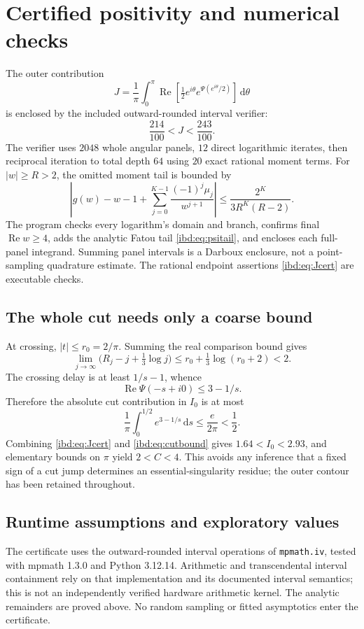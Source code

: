 \documentclass[11pt,letterpaper]{article}
\theoremstyle{remark}\newtheorem{remark}[theorem]{Remark}
\newcommand{\dd}{\,\mathrm d}
\DeclareMathOperator{\Rea}{Re}
\begin{document}
\section{Certified positivity and numerical checks}\label{ibd:sec:certificate}
The outer contribution
\[
 J=\frac1\pi\int_0^\pi
 \Rea\!\left[\tfrac12 e^{i\theta}e^{\Psi(e^{i\theta}/2)}\right]\dd\theta
\]
is enclosed by the included outward-rounded interval verifier:
\begin{equation}\label{ibd:eq:Jcert}
 \frac{214}{100}<J<\frac{243}{100}.
\end{equation}
The verifier uses $2048$ whole angular panels, $12$ direct logarithmic iterates, then reciprocal iteration to total depth $64$ using $20$ exact rational moment terms. For $|w|\geq R>2$, the omitted moment tail is bounded by
\begin{equation}\label{ibd:eq:momenttail}
 \left|g(w)-w-1+\sum_{j=0}^{K-1}\frac{(-1)^j\mu_j}{w^{j+1}}\right|
 \leq\frac{2^K}{3R^K(R-2)}.
\end{equation}
The program checks every logarithm's domain and branch, confirms final $\Rea w\geq4$, adds the analytic Fatou tail \eqref{ibd:eq:psitail}, and encloses each full-panel integrand. Summing panel intervals is a Darboux enclosure, not a point-sampling quadrature estimate. The rational endpoint assertions \eqref{ibd:eq:Jcert} are executable checks.

\subsection{The whole cut needs only a coarse bound}
At crossing, $|t|\leq r_0=2/\pi$. Summing the real comparison bound gives
\[
 \lim_{j\to\infty}\bigl(R_j-j+\tfrac13\log j\bigr)
 \leq r_0+\tfrac13\log(r_0+2)<2.
\]
The crossing delay is at least $1/s-1$, whence
\[
 \Rea\Psi(-s+i0)\leq3-1/s.
\]
Therefore the absolute cut contribution in $I_0$ is at most
\begin{equation}\label{ibd:eq:cutbound}
 \frac1\pi\int_0^{1/2}e^{3-1/s}\dd s
 \leq\frac e{2\pi}<\frac12.
\end{equation}
Combining \eqref{ibd:eq:Jcert} and \eqref{ibd:eq:cutbound} gives
$1.64<I_0<2.93$, and elementary bounds on $\pi$ yield $2<C<4$.
This avoids any inference that a fixed sign of a cut jump determines an essential-singularity residue; the outer contour has been retained throughout.

\subsection{Runtime assumptions and exploratory values}
The certificate uses the outward-rounded interval operations of \texttt{mpmath.iv}, tested with mpmath 1.3.0 and Python 3.12.14. Arithmetic and transcendental interval containment rely on that implementation and its documented interval semantics; this is not an independently verified hardware arithmetic kernel. The analytic remainders are proved above. No random sampling or fitted asymptotics enter the certificate.
\end{document}
